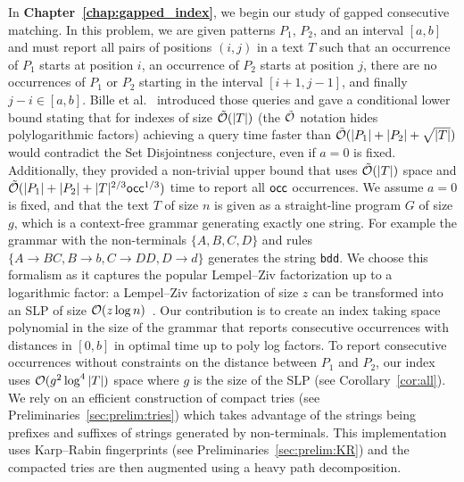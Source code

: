 In \textbf{Chapter~\ref{chap:gapped_index}}, we begin our study of gapped consecutive matching. In this problem, we are given patterns $P_1$, $P_2$, and an interval $[a,b]$ and must report all pairs of positions $(i,j)$ in a text $T$ such that an occurrence of $P_1$ starts at position $i$, an occurrence of $P_2$ starts at position $j$, there are no occurrences of $P_1$ or $P_2$ starting in the interval $[i+1,j-1]$, and finally $j-i \in [a,b]$.
Bille et al.~\cite{bille2022gapped} introduced those queries and gave a conditional lower bound stating that for indexes of size $\tilde {\mathcal{O}}(|T|)$ (the $\tilde {\mathcal{O}}$ notation hides polylogarithmic factors) achieving a query time faster than $\tilde {\mathcal{O}}(|P_1|+|P_2|+\sqrt{|T|})$ would contradict the Set Disjointness conjecture, even if $a=0$ is fixed. Additionally, they provided a non-trivial upper bound that uses $\tilde {\mathcal{O}}(|T|)$ space and $\tilde {\mathcal{O}} (|P_1| +|P_2| + |T|^{2/3}\mathsf{occ}^{1/3})$ time to report all $\mathsf{occ}$ occurrences. 
We assume $a=0$ is fixed, and that the text $T$ of size $n$ is given as a straight-line program $G$ of size $g$, which is a context-free grammar generating exactly one string. For example the grammar with the non-terminals $\{A,B,C,D\}$ and rules $\{A \rightarrow BC, B \rightarrow b, C \rightarrow DD, D\rightarrow d \}$ generates the string \texttt{bdd}.
We choose this formalism 
as it captures the popular Lempel--Ziv factorization up to a logarithmic factor: a Lempel--Ziv factorization of size $z$ can be transformed into an SLP of size $\mathcal{O}(z\log n)$~\cite{CharikarLLPPRSS02,Rytter02}.
%
Our contribution is to create an index taking space polynomial in the size of the grammar that reports consecutive occurrences with distances in $[0,b]$ in optimal time up to poly log factors.
To report consecutive occurrences without constraints on the distance between $P_1$ and $P_2$, our index uses $\mathcal{O}(g^2\log^4|T|)$ space where $g$ is the size of the SLP (see Corollary~\ref{cor:all}).
We rely on an efficient construction of compact tries (see Preliminaries~\ref{sec:prelim:tries}) which takes advantage of the strings being prefixes and suffixes of strings generated by non-terminals. This implementation uses Karp--Rabin fingerprints (see Preliminaries~\ref{sec:prelim:KR}) and the compacted tries are then augmented using a heavy path decomposition.
